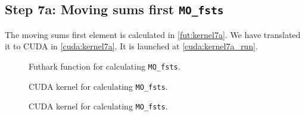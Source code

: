 \subsection{
    Step 7a: Moving sums first \texttt{MO\_fsts}
}

The moving sums first element is calculated in \autoref{fut:kernel7a}. We have
translated it to CUDA in \autoref{cuda:kernel7a}. It is launched at 
\autoref{cuda:kernel7a_run}.






\begin{figure}[H]
    \centering
    \caption{Futhark function for calculating \texttt{MO\_fsts}.}
    \label{fut:kernel7a}
\end{figure}


\begin{figure}[H]
    \centering
    \caption{CUDA kernel for calculating  \texttt{MO\_fsts}.}
    \label{cuda:kernel7a}
\end{figure}

\begin{figure}[H]
    \centering
    \caption{CUDA kernel for calculating  \texttt{MO\_fsts}.}
    \label{cuda:kernel7a_run}
\end{figure}

